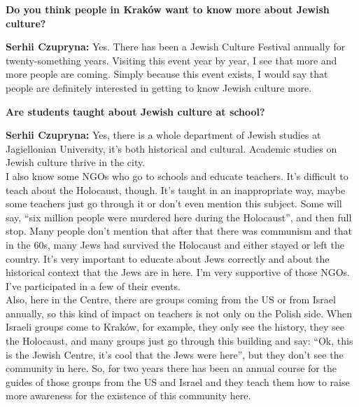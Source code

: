 \textbf{Do you think people in Kraków want to know more about Jewish culture?}\par
\textbf{Serhii Czupryna:} Yes. There has been a Jewish Culture Festival annually for twenty-something years. Visiting this event year by year, I see that more and more people are coming. Simply because this event exists, I would say that people are definitely interested in getting to know Jewish culture more.\par
\textbf{Are students taught about Jewish culture at school?}\par
\textbf{Serhii Czupryna:} Yes, there is a whole department of Jewish studies at Jagiellonian University, it’s both historical and cultural. Academic studies on Jewish culture thrive in the city.\\ 
I also know some NGOs who go to schools and educate teachers. It’s difficult to teach about the Holocaust, though. It’s taught in an inappropriate way, maybe some teachers just go through it or don’t even mention this subject. Some will say, ``six million people were murdered here during the Holocaust'', and then full stop. Many people don’t mention that after that there was communism and that in the 60s, many Jews had survived the Holocaust and either stayed or left the country. It’s very important to educate about Jews correctly and about the historical context that the Jews are in here. I’m very supportive of those NGOs. I’ve participated in a few of their events.\\
Also, here in the Centre, there are groups coming from the US or from Israel annually, so this kind of impact on teachers is not only on the Polish side. When Israeli groups come to Kraków, for example, they only see the history, they see the Holocaust, and many groups just go through this building and say: ``Ok, this is the Jewish Centre, it’s cool that the Jews were here'', but they don’t see the community in here. So, for two years there has been an annual course for the guides of those groups from the US and Israel and they teach them how to raise more awareness for the existence of this community here.\par  
